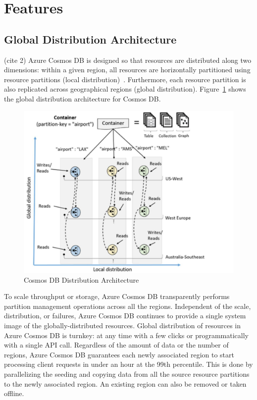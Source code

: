 \section{Features}

\subsection{Global Distribution Architecture}
(cite 2) Azure Cosmos DB is designed so that resources are distributed along two dimensions: within a given region, all resources are horizontally partitioned using resource partitions (local distribution)~\cite{hid-sp18-501-AzureBlog}. Furthermore, each resource partition is also replicated across geographical regions (global distribution). Figure~\ref{f:architecture} shows the global distribution architecture for Cosmos DB.


\begin{figure}[!ht]
  \centering\includegraphics[width=\columnwidth]{images/globe.pdf}
  \caption{Cosmos DB Distribution Architecture~\cite{hid-sp18-501-AzureBlog}}
\label{f:architecture}
\end{figure}


To scale throughput or storage, Azure Cosmos DB transparently performs partition management operations across all the regions. Independent of the scale, distribution, or failures, Azure Cosmos DB continues to provide a single system image of the globally-distributed resources. Global distribution of resources in Azure Cosmos DB is turnkey: at any time with a few clicks or programmatically with a single API call. Regardless of the amount of data or the number of regions, Azure Cosmos DB guarantees each newly associated region to start processing client requests in under an hour at the 99th percentile. This is done by parallelizing the seeding and copying data from all the source resource partitions to the newly associated region. An existing region can also be removed or taken offline.

